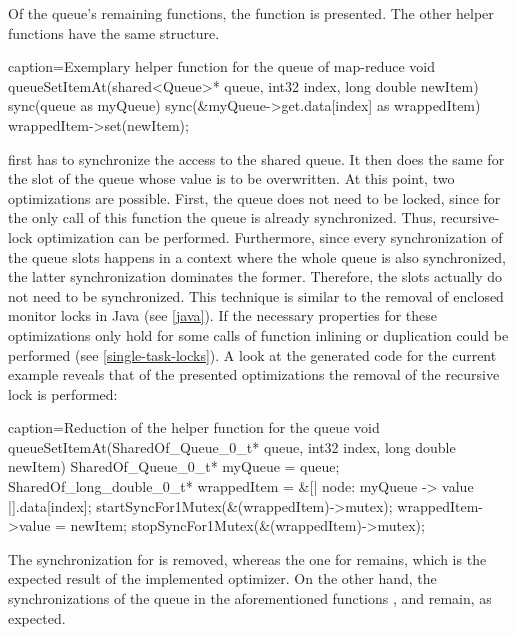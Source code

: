 Of the queue's remaining functions, the function  is presented. The other helper functions have the same structure.
\begin{ccode}{caption=Exemplary helper function for the queue of map-reduce}
void queueSetItemAt(shared<Queue>* queue, int32 index, long double newItem) { 
  sync(queue as myQueue) { 
    sync(&myQueue->get.data[index] as wrappedItem) { wrappedItem->set(newItem); } 
  } 
}
\end{ccode}
 first has to synchronize the access to the shared queue. It then does the same for the slot of the queue whose value is to be overwritten. At this point, two optimizations are possible. First, the queue does not need to be locked, since for the only call of this function the queue is already synchronized. Thus, recursive-lock optimization can be performed. Furthermore, since every synchronization of the queue slots happens in a context where the whole queue is also synchronized, the latter synchronization dominates the former. Therefore, the slots actually do not need to be synchronized. This technique is similar to the removal of enclosed monitor locks in Java (see \ref{java}). If the necessary properties for these optimizations only hold for some calls of  function inlining or duplication could be performed (see \ref{single-task-locks}). A look at the generated code for the current example reveals that of the presented optimizations the removal of the recursive lock is performed:
\begin{ccode}{caption=Reduction of the helper function for the queue}
void queueSetItemAt(SharedOf_Queue_0_t* queue, int32 index, long double newItem) { 
  { 
    SharedOf_Queue_0_t* myQueue = queue; 
    { 
      { 
        SharedOf_long_double_0_t* wrappedItem = &[| node: myQueue -> value |].data[index]; 
        startSyncFor1Mutex(&(wrappedItem)->mutex); 
        { wrappedItem->value = newItem; } 
        stopSyncFor1Mutex(&(wrappedItem)->mutex); 
      } 
    } 
  } 
}
\end{ccode}
The synchronization for  is removed, whereas the one for  remains, which is the expected result of the implemented optimizer. On the other hand, the synchronizations of the queue in the aforementioned functions ,  and  remain, as expected.


